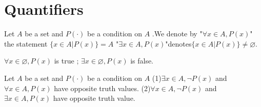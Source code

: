 \documentclass{book}
\numberwithin{equation}{section}
\begin{document}
\section{Quantifiers}
\begin{definitionenv}
    Let $A$ be a set and $P(\cdot)$ be a condition on $A$ .We denote by 
    \newline
    "$\forall x\in A,  P(x)$" the statement $\{x\in A|P(x)\}=A$
    \newline
    "$\exists x\in A, P(x)$"denotes$\{x\in A|P(x)\}\not= \varnothing$.
\end{definitionenv}
\begin{exampleenv}
    $\forall x\in \varnothing , P(x)$ is true ; $\exists x\in \varnothing, P(x)$ is false.
\end{exampleenv}
\begin{theoremenv}\label{theorem2.4.1}
    Let $A$ be a set and $P(\cdot)$ be a condition on $A$
    \newline
    (1)$\exists x\in A, \neg P(x) $ and $ \forall x\in A, P(x)$ have opposite truth values.
    \newline
    (2)$\forall x\in A, \neg P(x)$ and $\exists x\in A, P(x)$ have opposite truth value.
\end{theoremenv}
\end{document}
